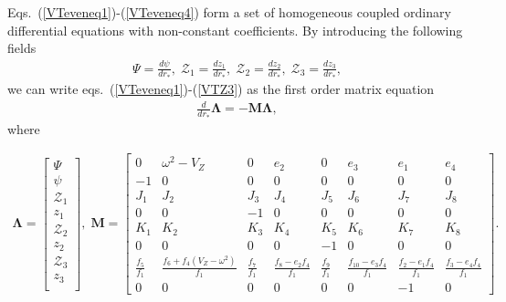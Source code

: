 \documentclass[10pt,twocolumn,preprintnumbers,amsmath,amssymb,nofootinbib
,superscriptaddress]{revtex4-1}
\begin{document}
{{{Eqs.~(\ref{VTeveneq1})-(\ref{VTeveneq4}) form a set of homogeneous coupled ordinary differential equations with non-constant coefficients. By introducing the following fields
\begin{align}
\Psi=\frac{d\psi}{dr_\ast},\;\mathcal{Z}_1=\frac{dz_1}{dr_\ast},\;\mathcal{Z}_2=\frac{dz_2}{dr_\ast},\;\mathcal{Z}_3=\frac{dz_3}{dr_\ast},\label{VTZ3}
\end{align}
we can write eqs.~(\ref{VTeveneq1})-(\ref{VTZ3}) as the first order matrix equation
\begin{align}
\frac{d}{dr_\ast}\bm{\Lambda}=-\bm{M}\bm{\Lambda},
\end{align}
where
\begin{widetext}
\begin{align}
\bm{\Lambda}=\begin{bmatrix}\label{VTmatrix}
\Psi\\
\psi\\
\mathcal{Z}_1\\
z_1\\
\mathcal{Z}_2\\
z_2\\
\mathcal{Z}_3\\
z_3\\
\end{bmatrix},\;
\bm{M}=\begin{bmatrix}
0&\omega^2-V_Z&0&e_2&0&e_3&e_1&e_4\\
-1&0&0&0&0&0&0&0\\
J_1&J_2&J_3&J_4&J_5&J_6&J_7&J_8\\
0&0&-1&0&0&0&0&0\\
K_1&K_2&K_3&K_4&K_5&K_6&K_7&K_8\\
0&0&0&0&-1&0&0&0\\
\frac{f_5}{f_1}&\frac{f_6+f_4\left(V_Z-\omega^2\right)}{f_1}&\frac{f_7}{f_1}&\frac{f_8-e_2f_4}{f_1}&\frac{f_9}{f_1}&\frac{f_{10}-e_3f_4}{f_1}&\frac{f_2-e_1f_4}{f_1}&\frac{f_3-e_4f_4}{f_1}\\
0&0&0&0&0&0&-1&0
\end{bmatrix}.
\end{align}
\end{widetext}
}}}
\end{document}
